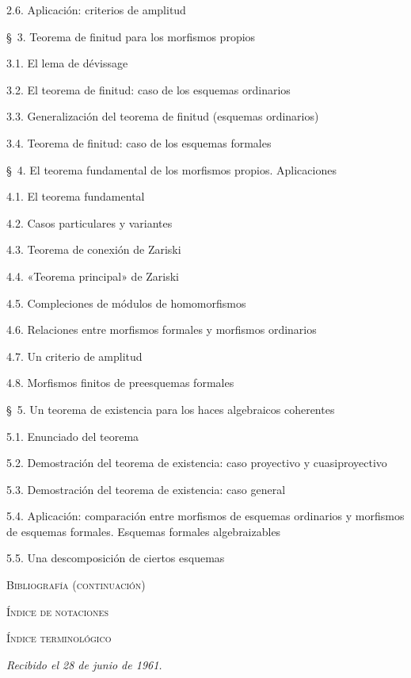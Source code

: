 \begin{flushleft}
2.6. Aplicación: criterios de amplitud 

\medskip
\S~3. Teorema de finitud para los morfismos propios 

3.1. El lema de dévissage 

3.2. El teorema de finitud: caso de los esquemas ordinarios 

3.3. Generalización del teorema de finitud (esquemas ordinarios) 

3.4. Teorema de finitud: caso de los esquemas formales 

\medskip
\S~4. El teorema fundamental de los morfismos propios. Aplicaciones 

4.1. El teorema fundamental 

4.2. Casos particulares y variantes 

4.3. Teorema de conexión de Zariski 

4.4. «Teorema principal» de Zariski 

4.5. Compleciones de módulos de homomorfismos 

4.6. Relaciones entre morfismos formales y morfismos ordinarios 

4.7. Un criterio de amplitud 

4.8. Morfismos finitos de preesquemas formales 


\S~5. Un teorema de existencia para los haces algebraicos coherentes 

5.1. Enunciado del teorema 

5.2. Demostración del teorema de existencia: caso proyectivo y cuasiproyectivo

5.3. Demostración del teorema de existencia: caso general 

5.4. Aplicación: comparación entre morfismos de esquemas ordinarios y
morfismos de esquemas formales. Esquemas formales algebraizables 

5.5. Una descomposición de ciertos esquemas 

\medskip
\textsc{Bibliografía (continuación)} 

\textsc{Índice de notaciones} 

\textsc{Índice terminológico} 

\begin{flushright}
\emph{Recibido el 28 de junio de 1961.}
\end{flushright}
\end{flushleft}
